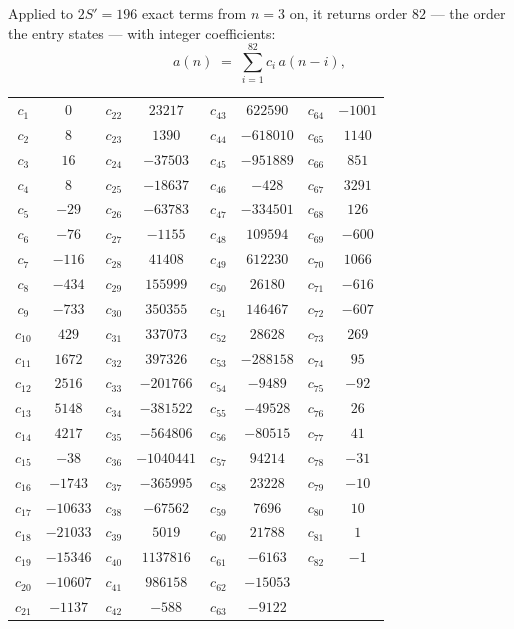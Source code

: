 \documentclass[11pt,a4paper]{article}
\theoremstyle{plain}
\theoremstyle{definition}
\begin{document}
Applied to $2S'=196$ exact terms from $n=3$ on, it returns order $82$ --- the
order the entry states --- with integer coefficients:
\[
a(n)\;=\;\sum_{i=1}^{82}c_i\,a(n-i),
\]
\begin{center}\small
\begin{tabular}{cccccccc}
$c_{1}$ & $0$ & $c_{22}$ & $23217$ & $c_{43}$ & $622590$ & $c_{64}$ & $-1001$ \\
$c_{2}$ & $8$ & $c_{23}$ & $1390$ & $c_{44}$ & $-618010$ & $c_{65}$ & $1140$ \\
$c_{3}$ & $16$ & $c_{24}$ & $-37503$ & $c_{45}$ & $-951889$ & $c_{66}$ & $851$ \\
$c_{4}$ & $8$ & $c_{25}$ & $-18637$ & $c_{46}$ & $-428$ & $c_{67}$ & $3291$ \\
$c_{5}$ & $-29$ & $c_{26}$ & $-63783$ & $c_{47}$ & $-334501$ & $c_{68}$ & $126$ \\
$c_{6}$ & $-76$ & $c_{27}$ & $-1155$ & $c_{48}$ & $109594$ & $c_{69}$ & $-600$ \\
$c_{7}$ & $-116$ & $c_{28}$ & $41408$ & $c_{49}$ & $612230$ & $c_{70}$ & $1066$ \\
$c_{8}$ & $-434$ & $c_{29}$ & $155999$ & $c_{50}$ & $26180$ & $c_{71}$ & $-616$ \\
$c_{9}$ & $-733$ & $c_{30}$ & $350355$ & $c_{51}$ & $146467$ & $c_{72}$ & $-607$ \\
$c_{10}$ & $429$ & $c_{31}$ & $337073$ & $c_{52}$ & $28628$ & $c_{73}$ & $269$ \\
$c_{11}$ & $1672$ & $c_{32}$ & $397326$ & $c_{53}$ & $-288158$ & $c_{74}$ & $95$ \\
$c_{12}$ & $2516$ & $c_{33}$ & $-201766$ & $c_{54}$ & $-9489$ & $c_{75}$ & $-92$ \\
$c_{13}$ & $5148$ & $c_{34}$ & $-381522$ & $c_{55}$ & $-49528$ & $c_{76}$ & $26$ \\
$c_{14}$ & $4217$ & $c_{35}$ & $-564806$ & $c_{56}$ & $-80515$ & $c_{77}$ & $41$ \\
$c_{15}$ & $-38$ & $c_{36}$ & $-1040441$ & $c_{57}$ & $94214$ & $c_{78}$ & $-31$ \\
$c_{16}$ & $-1743$ & $c_{37}$ & $-365995$ & $c_{58}$ & $23228$ & $c_{79}$ & $-10$ \\
$c_{17}$ & $-10633$ & $c_{38}$ & $-67562$ & $c_{59}$ & $7696$ & $c_{80}$ & $10$ \\
$c_{18}$ & $-21033$ & $c_{39}$ & $5019$ & $c_{60}$ & $21788$ & $c_{81}$ & $1$ \\
$c_{19}$ & $-15346$ & $c_{40}$ & $1137816$ & $c_{61}$ & $-6163$ & $c_{82}$ & $-1$ \\
$c_{20}$ & $-10607$ & $c_{41}$ & $986158$ & $c_{62}$ & $-15053$ &  &  \\
$c_{21}$ & $-1137$ & $c_{42}$ & $-588$ & $c_{63}$ & $-9122$ &  &  \\
\end{tabular}
\end{center}
\end{document}
